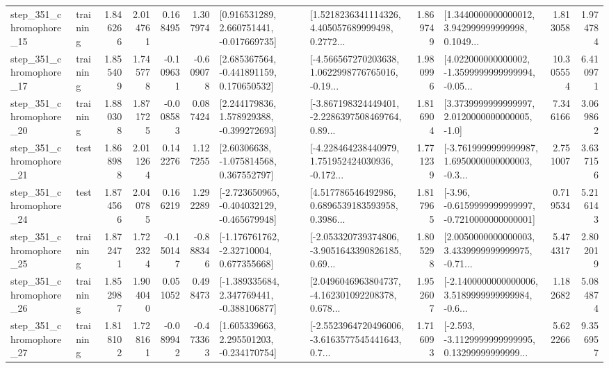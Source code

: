 \begin{tabular}{llrrrrllrlrr}
  step\_351\_chromophore\_15 &  training &      1.846266 &    2.014761 &      0.168495 &  1.307974 &    [0.916531289, 2.660751441, -0.017669735] &  [1.5218236341114326, 4.405057689999498, 0.2772... &       1.869749 &  [1.3440000000000012, 3.942999999999998, 0.1049... &            1.813058 &          1.974784 \\
  step\_351\_chromophore\_17 &  training &      1.855409 &    1.745778 &     -0.109631 & -0.609078 &    [2.685367564, -0.441891159, 0.170650532] &  [-4.566567270203638, 1.0622998776765016, -0.19... &       1.980996 &  [4.022000000000002, -1.3599999999999994, -0.05... &           10.305554 &          6.410971 \\
  step\_351\_chromophore\_20 &  training &      1.880308 &    1.871725 &     -0.008583 &  0.087424 &    [2.244179836, 1.578929388, -0.399272693] &  [-3.867198324449401, -2.2286397508469764, 0.89... &       1.816904 &     [3.3739999999999997, 2.0120000000000005, -1.0] &            7.346166 &          3.069862 \\
  step\_351\_chromophore\_21 &      test &      1.868988 &    2.011264 &      0.142276 &  1.127255 &     [2.60306638, -1.075814568, 0.367552797] &  [-4.228464238440979, 1.751952424030936, -0.172... &       1.771239 &  [-3.7619999999999987, 1.6950000000000003, -0.3... &            2.751007 &          3.637156 \\
  step\_351\_chromophore\_24 &      test &      1.874566 &    2.040785 &      0.166219 &  1.292289 &  [-2.723650965, -0.404032129, -0.465679948] &  [4.517786546492986, 0.6896539183593958, 0.3986... &       1.817965 &  [-3.96, -0.6159999999999997, -0.7210000000000001] &            0.719534 &          5.216143 \\
  step\_351\_chromophore\_25 &  training &      1.872471 &    1.722324 &     -0.150147 & -0.888346 &    [-1.176761762, -2.32710004, 0.677355668] &  [-2.053320739374806, -3.9051643390826185, 0.69... &       1.805298 &  [2.0050000000000003, 3.4339999999999975, -0.71... &            5.474317 &          2.802019 \\
  step\_351\_chromophore\_26 &  training &      1.852987 &    1.904040 &      0.051052 &  0.498473 &   [-1.389335684, 2.347769441, -0.388106877] &  [2.0496046963804737, -4.162301092208378, 0.678... &       1.952607 &  [-2.1400000000000006, 3.5189999999999984, -0.6... &            1.182682 &          5.084874 \\
  step\_351\_chromophore\_27 &  training &      1.818102 &    1.728161 &     -0.089942 & -0.473363 &    [1.605339663, 2.295501203, -0.234170754] &  [-2.5523964720496006, -3.6163577545441643, 0.7... &       1.716093 &  [-2.593, -3.1129999999999995, 0.13299999999999... &            5.622266 &          9.356957 \\

\end{tabular}
